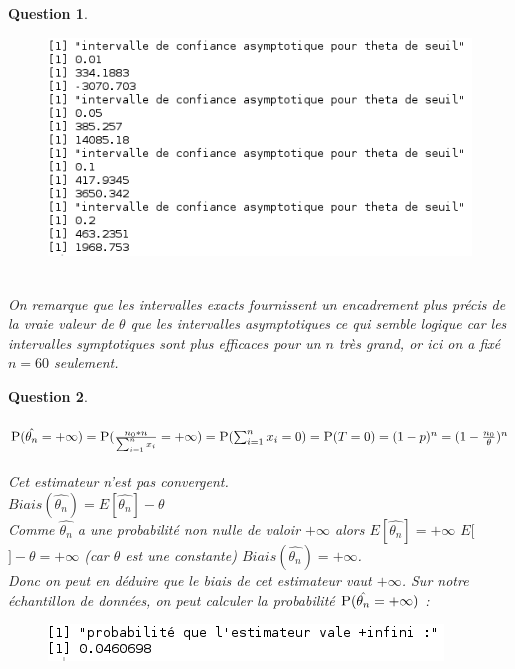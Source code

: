 \documentclass[a4paper,11pt]{article}
\newtheorem{exo1}{Question}
\begin{document}
\begin{exo1}
\begin{figure}[h]
\end{figure}
\begin{figure}[h]
\includegraphics[scale=0.7]{images/Q1_4_asymp.png}
\end{figure} \ \\
On remarque que les intervalles exacts fournissent un encadrement plus précis de la vraie valeur de $\theta$ que les intervalles asymptotiques ce qui semble logique car les intervalles symptotiques sont plus efficaces pour un $n$ très grand, or ici on a fixé $n=60$ seulement.
\end{exo1}

\begin{exo1} \ \\ \\
$\textsc{P}(\hat{\theta_{n}}=+\infty) = \textsc{P}(\frac{n_{0}*n}{\sum_{i=1}^{n} x_{i}}=+\infty) = \textsc{P}(\sum_{i=1}^{n} x_{i}=0) = \textsc{P}(T=0) = (1-p)^n = (1-\frac{n_{0}}{\theta})^n$ \ \\
Cet estimateur n'est pas convergent. \ \\
$Biais(\hat{\theta_{n}}) = E[\hat{\theta_{n}}]-\theta$ \ \\
Comme $\hat{\theta_{n}}$ a une probabilité non nulle de valoir $+\infty$ alors $E[\hat{\theta_{n}}]=+\infty$ \Rightarrow $E[$$]-\theta = +\infty$ (car $\theta$ est une constante) \Rightarrow $Biais(\hat{\theta_{n}}) = +\infty$. \ \\
Donc on peut en déduire que le biais de cet estimateur vaut $+\infty$.
Sur notre échantillon de données, on peut calculer la probabilité $\textsc{P}(\hat{\theta_{n}}=+\infty)$ :
\begin{figure}[h]
\includegraphics[scale=0.7]{images/Q1_5.png}
\end{figure} \ \\
\end{exo1}
\end{document}
